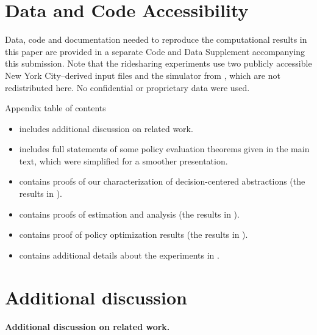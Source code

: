 \documentclass[opre,nonblindrev]{informs4}
\begin{document}
 \section*{Data and Code Accessibility}

  Data, code and documentation needed to
  reproduce the
  computational results in this paper are provided in a
  separate
  Code and Data Supplement accompanying this submission. Note that the ridesharing experiments use two
  publicly accessible
  New York City--derived input files and the simulator from \citet{johari2025estimation}, which are not redistributed here. No confidential or
  proprietary data were
  used.

\clearpage



\ECSwitch
{}


Appendix table of contents
\begin{itemize}
    \item {} includes additional discussion on related work. 
    \item {} includes full statements of some policy evaluation theorems given in the main text, which were simplified for a smoother presentation. 
    \item {} contains proofs of our characterization of decision-centered abstractions (the results in ).
    \item {} contains proofs of estimation and analysis (the results in ).
    \item {} contains proof of policy optimization results (the results in ).
    \item {} contains additional details about the experiments in .
\end{itemize}



\section{Additional discussion}\label{sec-addl-discussion}

\paragraph{Additional discussion on related work.}
\end{document}
